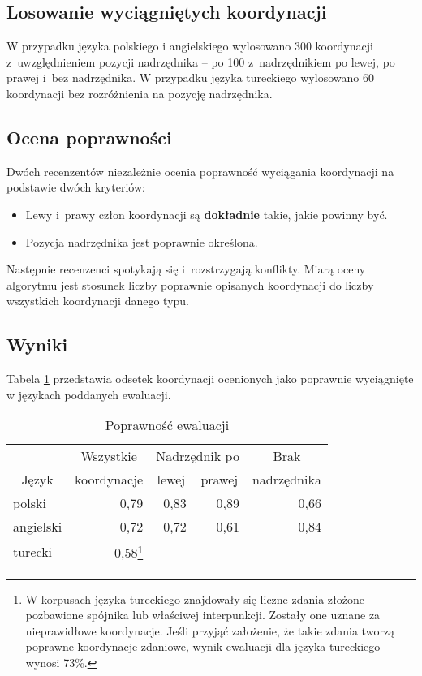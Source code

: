 \subsection{Losowanie wyciągniętych koordynacji}

W przypadku języka polskiego i angielskiego wylosowano 300 koordynacji z~uwzględnieniem pozycji nadrzędnika -- po 100 z~nadrzędnikiem po lewej, po prawej i~bez nadrzędnika. W przypadku języka tureckiego wylosowano 60 koordynacji bez rozróżnienia na pozycję nadrzędnika.

\subsection{Ocena poprawności}

Dwóch recenzentów niezależnie ocenia poprawność wyciągania koordynacji na podstawie dwóch kryteriów:

\begin{itemize}
\item Lewy i~prawy człon koordynacji są \textbf{dokładnie} takie, jakie powinny być.
\item Pozycja nadrzędnika jest poprawnie określona.
\end{itemize}

Następnie recenzenci spotykają się i~rozstrzygają konflikty. Miarą oceny algorytmu jest stosunek liczby poprawnie opisanych koordynacji do liczby wszystkich koordynacji danego typu.

\subsection{Wyniki}

Tabela \ref{tab:ewal} przedstawia odsetek koordynacji ocenionych jako poprawnie wyciągnięte w językach poddanych ewaluacji. 

\begin{table}[H]
\centering
\begin{tabular}{lrrrr}
\toprule
& \multicolumn{1}{c}{Wszystkie}	& \multicolumn{2}{c}{Nadrzędnik po} 	& \multicolumn{1}{c}{Brak} \\
\multicolumn{1}{c}{Język}	& \multicolumn{1}{c}{koordynacje}	
& \multicolumn{1}{c}{lewej}			& \multicolumn{1}{c}{prawej}	& \multicolumn{1}{c}{nadrzędnika} \\
\midrule
polski		& 0,79 & 0,83 & 0,89 & 0,66 \\
angielski	& 0,72 & 0,72 & 0,61 & 0,84 \\
turecki		& 0,58\footnote{W korpusach języka tureckiego znajdowały się liczne zdania złożone pozbawione spójnika lub właściwej interpunkcji. Zostały one uznane za nieprawidłowe koordynacje. Jeśli przyjąć założenie,  że takie zdania tworzą poprawne koordynacje zdaniowe, wynik ewaluacji dla języka tureckiego wynosi 73\%.} &  &  &  \\
\bottomrule
\end{tabular}
\caption{Poprawność ewaluacji}
\label{tab:ewal}
\end{table}

